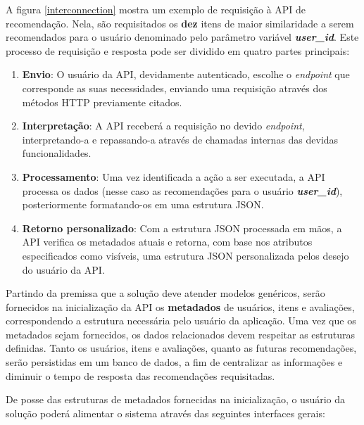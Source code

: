 \documentclass[12pt, openright, oneside, a4paper, brazil]{abntex2}
\begin{document}
A figura \ref{interconnection} mostra um exemplo de requisição à API de recomendação. Nela, são requisitados os \textbf{dez} itens de maior similaridade a serem recomendados para o usuário denominado pelo parâmetro variável \textbf{\textit{user\_id}}. Este processo de requisição e resposta pode ser dividido em quatro partes principais:

\begin{enumerate}
	\item \textbf{Envio}: O usuário da API, devidamente autenticado, escolhe o \textit{endpoint} que corresponde as suas necessidades, enviando uma requisição através dos métodos HTTP previamente citados.

	\item \textbf{Interpretação}: A API receberá a requisição no devido \textit{endpoint}, interpretando-a e repassando-a através de chamadas internas das devidas funcionalidades.

	\item \textbf{Processamento}: Uma vez identificada a ação a ser executada, a API processa os dados (nesse caso as recomendações para o usuário \textbf{\textit{user\_id}}), posteriormente formatando-os em uma estrutura JSON.

	\item \textbf{Retorno personalizado}: Com a estrutura JSON processada em mãos, a API verifica os metadados atuais e retorna, com base nos atributos especificados como visíveis, uma estrutura JSON personalizada pelos desejo do usuário da API.
\end{enumerate}

Partindo da premissa que a solução deve atender modelos genéricos, serão fornecidos na inicialização da API os \textbf{metadados} de usuários, itens e avaliações, correspondendo a estrutura necessária pelo usuário da aplicação. Uma vez que os metadados sejam fornecidos, os dados relacionados devem respeitar as estruturas definidas. Tanto os usuários, itens e avaliações, quanto as futuras recomendações, serão persistidas em um banco de dados, a fim de centralizar as informações e diminuir o tempo de resposta das recomendações requisitadas.

De posse das estruturas de metadados fornecidas na inicialização, o usuário da solução poderá alimentar o sistema através das seguintes interfaces gerais:
\end{document}
